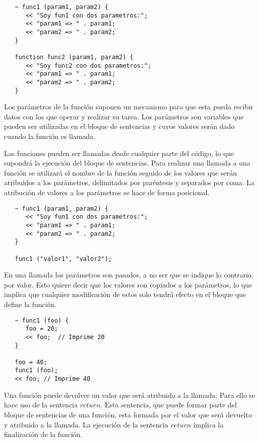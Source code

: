 \begin{lstlisting}
   ~ func1 (param1, param2) { 
      << "Soy fun1 con dos parametros:";
      << "param1 => " . param1;
      << "param2 => " . param2;
   }
   
   function func2 (param1, param2) { 
      << "Soy func2 con dos parametros:";
      << "param1 => " . param1;
      << "param2 => " . param2;
   }
\end{lstlisting}

Los parámetros de la función suponen un mecanismo para que esta pueda recibir datos con los que operar
y realizar su tarea. Los parámetros son variables que pueden ser utilizadas en el bloque de sentencias
y cuyos valores serán dado cuando la función es llamada.

Las funciones pueden ser llamadas desde cualquier parte del código, lo que supondrá la ejecución del bloque
de sentencias. Para realizar una llamada a una función se utilizará el nombre de la función seguido de los 
valores que serán atribuidos a los parámetros, delimitados por paréntesis y separados por coma. La atribución
de valores a los parámetros se hace de forma posicional. \\

\begin{lstlisting}
   ~ func1 (param1, param2) { 
      << "Soy fun1 con dos parametros:";
      << "param1 => " . param1;
      << "param2 => " . param2;
   }
   
   func1 ("valor1", "valor2");
\end{lstlisting}

En una llamada los parámetros son pasados, a no ser que se indique lo contrario, por valor. Esto quiere decir 
que los valores son copiados a los parámetros, lo que implica que cualquier modificación de estos solo tendrá efecto en el bloque 
que define la función. \\


\begin{lstlisting}
   ~ func1 (foo) { 
      foo = 20;
      << foo;  // Imprime 20
   }
   
   foo = 40;
   func1 (foo);
   << foo; // Imprime 40
\end{lstlisting}


Una función puede devolver un valor que será atribuido a la llamada. Para ello 
se hace uso de la sentencia $return$. Esta sentencia, que puede formar parte del
bloque de sentencias de una función, esta formada por el valor que será devuelto 
y atribuido a la llamada. La ejecución de la sentencia $return$ implica 
la finalización de la función.

